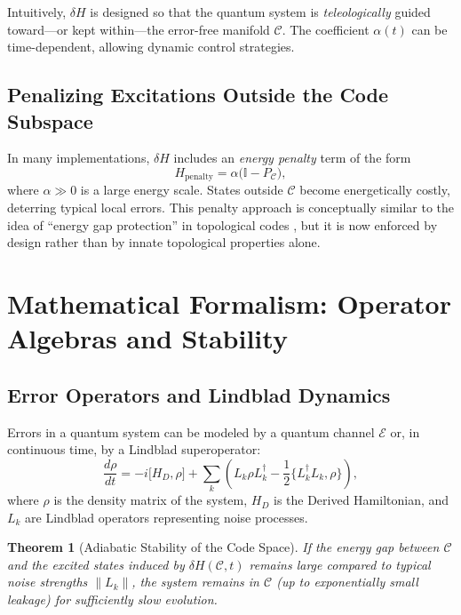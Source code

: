 \documentclass[11pt]{article}
\newtheorem{theorem}{Theorem}[section]
\begin{document}
Intuitively, $\delta H$ is designed so that the quantum system is \emph{teleologically} guided toward---or kept within---the error-free manifold $\mathcal{C}$. The coefficient $\alpha(t)$ can be time-dependent, allowing dynamic control strategies.

\subsection{Penalizing Excitations Outside the Code Subspace}
In many implementations, $\delta H$ includes an \emph{energy penalty} term of the form
\begin{equation}
H_{\mathrm{penalty}} = \alpha \big(\mathbb{I} - P_{\mathcal{C}}\big),
\end{equation}
where $\alpha \gg 0$ is a large energy scale. States outside $\mathcal{C}$ become energetically costly, deterring typical local errors. This penalty approach is conceptually similar to the idea of ``energy gap protection'' in topological codes \cite{Kitaev, Freedman}, but it is now enforced by design rather than by innate topological properties alone.

\section{Mathematical Formalism: Operator Algebras and Stability}
\label{sec:math-formalism}

\subsection{Error Operators and Lindblad Dynamics}
Errors in a quantum system can be modeled by a quantum channel $\mathcal{E}$ or, in continuous time, by a Lindblad superoperator:
\begin{equation}
    \frac{d\rho}{dt} = -i \big[H_D, \rho\big] + \sum_k \left( L_k \rho L_k^\dagger - \frac{1}{2}\{L_k^\dagger L_k, \rho\}\right),
\end{equation}
where $\rho$ is the density matrix of the system, $H_D$ is the Derived Hamiltonian, and $L_k$ are Lindblad operators representing noise processes.

\begin{theorem}[Adiabatic Stability of the Code Space]
\label{thm:adiabatic}
If the energy gap between $\mathcal{C}$ and the excited states induced by $\delta H(\mathcal{C}, t)$ remains large compared to typical noise strengths $\|L_k\|$, the system remains in $\mathcal{C}$ (up to exponentially small leakage) for sufficiently slow evolution.
\end{theorem}
\end{document}
